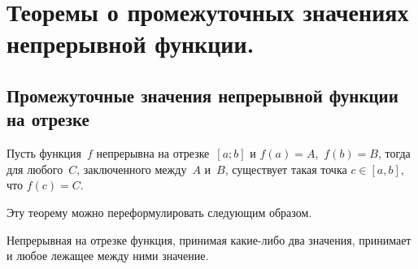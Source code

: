 \chapter{Теоремы о промежуточных значениях непрерывной функции.}
\section{Промежуточные значения непрерывной функции на отрезке}

\begin{thm}  \label{ch3n2}
Пусть функция~$f$ непрерывна на отрезке~$[a;b]$ и $f(a) = A$,~$f(b) = B$, тогда для любого~$C$, заключенного между~$A$ и~$B$, существует такая точка $c \in [a,b]$, что $f(c)=C$.
\end{thm}
Эту теорему можно переформулировать следующим образом.
\begin{thmn} Непрерывная на отрезке функция, принимая какие-либо два значения, принимает и любое лежащее между ними значение. 
\end{thmn}
